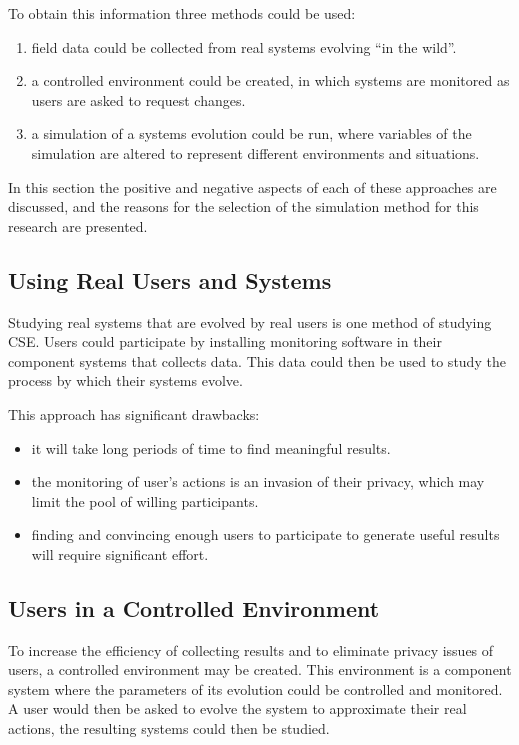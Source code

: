 To obtain this information three methods could be used:
\begin{enumerate}
  \item field data could be collected from real systems evolving ``in the wild''.
  \item a controlled environment could be created, in which systems are monitored as users are asked to request changes.
  \item a simulation of a systems evolution could be run, where variables of the simulation are altered to represent different environments and situations.
\end{enumerate} 

In this section the positive and negative aspects of each of these approaches are discussed,
and the reasons for the selection of the simulation method for this research are presented.

\subsection{Using Real Users and Systems}
Studying real systems that are evolved by real users is one method of studying CSE.
Users could participate by installing monitoring software in their component systems that collects data.
This data could then be used to study the process by which their systems evolve.

This approach  has significant drawbacks:
\begin{itemize}
  \item it will take long periods of time to find meaningful results.
  \item the monitoring of user's actions is an invasion of their privacy, which may limit the pool of willing participants.
  \item finding and convincing enough users to participate to generate useful results will require significant effort.
\end{itemize}

\subsection{Users in a Controlled Environment}
To increase the efficiency of collecting results and to eliminate privacy issues of users, a controlled environment may be created.
This environment is a component system where the parameters of its evolution could be controlled and monitored.
A user would then be asked to evolve the system to approximate their real actions, the resulting systems could then be studied.

